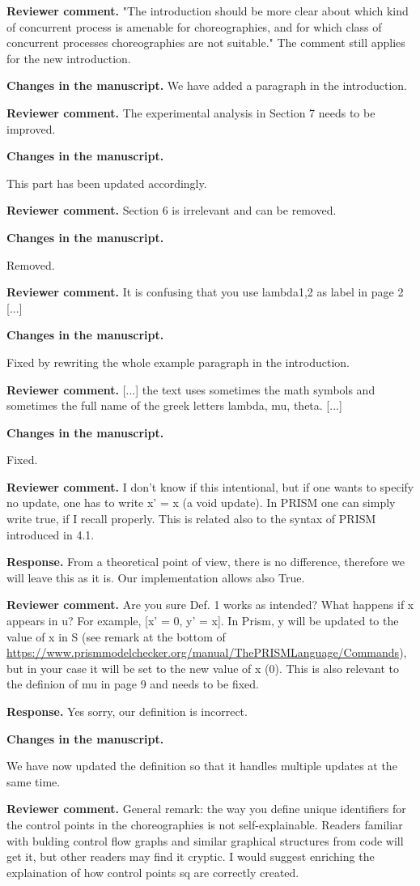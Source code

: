 \documentclass[11pt]{article}
\newcommand{\revcomment}[1]{%
  \begin{reviewercomment}
  \textbf{Reviewer comment.} #1
  \end{reviewercomment}
}
\newcommand{\revresponse}[2][]{%
  \par\noindent\textbf{Response.} #1 #2
}
\newcommand{\revchanges}[2][]{%
  \par\noindent\textbf{Changes in the manuscript.} #1
  #2\par\bigskip
}
\begin{document}
\revcomment{ "The introduction should be more clear about which kind
  of concurrent process is amenable for choreographies, and for which
  class of concurrent processes choreographies are not suitable."  The
  comment still applies for the new introduction.  }

\revchanges{We have added a paragraph in the introduction. }

  
\revcomment{
The experimental analysis in Section 7 needs to be improved.
}

\revchanges{
  This part has been updated accordingly. 
}

\revcomment{
Section 6 is irrelevant and can be removed.
}

\revchanges{
  Removed. 
}


\revcomment{
It is confusing that you use lambda1,2 as label in page 2 [...]
}
%
\revchanges{
 Fixed by rewriting the whole example paragraph in the introduction. 
}

\revcomment{ [...]
the text uses sometimes the math symbols and sometimes the full name of the greek letters lambda, mu, theta. [...]
}
%
\revchanges{
 Fixed.
}

\revcomment{
  I don't know if this intentional, but if one wants to specify no update, one has to write x' = x (a void update). In PRISM one can simply write true, if I recall properly. This is related also to the syntax of PRISM introduced in 4.1.
}

\revresponse{
  From a theoretical point of view, there is no difference, therefore we will leave this as it is. Our implementation allows also True. 
}

\revcomment{
  Are you sure Def. 1 works as intended? What happens if x appears in u? For example, [x' = 0, y' = x]. In Prism, y will be updated to the value of x in S (see remark at the bottom of \url{https://www.prismmodelchecker.org/manual/ThePRISMLanguage/Commands}), but in your case it will be set to the new value of x (0). This is also relevant to the definion of mu in page 9 and needs to be fixed. 
}

\revresponse{
 Yes sorry, our definition is incorrect. 
}

\revchanges{
 We have now updated the definition so that it handles multiple updates at the same time. 
}

\revcomment{
General remark: the way you define unique identifiers for the control points in the choreographies is not self-explainable. Readers familiar with bulding control flow graphs and similar graphical structures from code will get it, but other readers may find it cryptic. I would suggest enriching the explaination of how control points sq are correctly created. }
\end{document}
